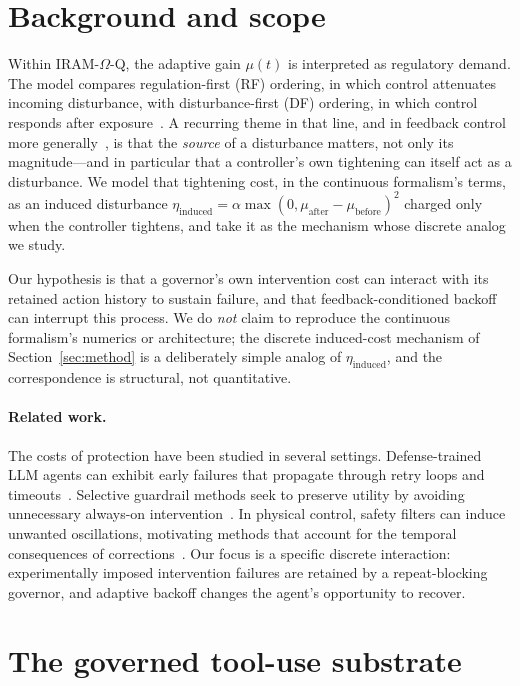 \documentclass[11pt]{article}
\begin{document}
\section{Background and scope}
\label{sec:background}

Within IRAM-$\Omega$-Q, the adaptive gain $\mu(t)$ is interpreted as
regulatory demand. The model compares regulation-first (RF) ordering, in which
control attenuates incoming disturbance, with disturbance-first (DF) ordering,
in which control responds after exposure~\cite{ziegler2026iramomegaq,ziegler2026carryover}.
A recurring theme in that
line, and in feedback control more generally~\cite{astrom2008feedback}, is that
the \emph{source} of a disturbance matters, not only its magnitude---and in
particular that a controller's own tightening can itself act as a disturbance.
We model that tightening cost, in the continuous formalism's terms, as an
induced disturbance
$\eta_{\mathrm{induced}} =
\alpha\max(0,\mu_{\mathrm{after}}-\mu_{\mathrm{before}})^2$ charged only when
the controller tightens, and take it as the mechanism whose discrete analog we
study.

Our hypothesis is that a governor's own intervention cost can interact with
its retained action history to sustain failure, and that feedback-conditioned
backoff can interrupt this process. We do \emph{not} claim to reproduce the
continuous formalism's numerics or architecture; the discrete induced-cost
mechanism of Section~\ref{sec:method} is a deliberately simple analog of
$\eta_{\mathrm{induced}}$, and the correspondence is structural, not
quantitative.

\paragraph{Related work.}
The costs of protection have been studied in several settings. Defense-trained
LLM agents can exhibit early failures that propagate through retry loops and
timeouts~\cite{li2026autonomytax}. Selective guardrail methods seek to preserve
utility by avoiding unnecessary always-on intervention~\cite{kim2026causalarmor}.
In physical control, safety filters can induce unwanted oscillations, motivating
methods that account for the temporal consequences of
corrections~\cite{pizarro2023multistep}. Our focus is a specific discrete
interaction: experimentally imposed intervention failures are retained by a
repeat-blocking governor, and adaptive backoff changes the agent's opportunity
to recover.

\section{The governed tool-use substrate}
\label{sec:substrate}
\end{document}
